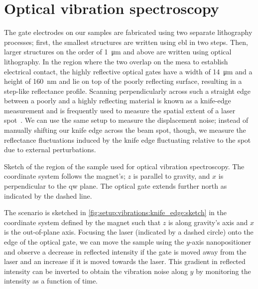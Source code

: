 \section{Optical vibration spectroscopy}\label{sec:setup:vibrations:optic}
The gate electrodes on our samples are fabricated using two separate lithography processes; first, the smallest structures are written using \gls{ebl} in two steps.
Then, larger structures on the order of \qty{1}{\micro\meter} and above are written using optical lithography.
In the region where the two overlap on the mesa to establish electrical contact, the highly reflective  optical gates have a width of \qty{14}{\micro\meter} and a height of \qty{160}{\nano\meter} and lie on top of the poorly reflecting  surface, resulting in a step-like reflectance profile.
Scanning perpendicularly across such a straight edge between a poorly and a highly reflecting material is known as a knife-edge measurement and is frequently used to measure the spatial extent of a laser spot~\cite{Arnaud1971,Skinner1972,Khosrofian1983}.
We can use the same setup to measure the displacement noise; instead of manually shifting our knife edge across the beam spot, though, we measure the reflectance fluctuations induced by the knife edge fluctuating relative to the spot due to external perturbations.

\begin{marginfigure}
    \centering
    
    \caption[]{
        Sketch of the region of the sample used for optical vibration spectroscopy.
        The coordinate system follows the magnet's; $z$ is parallel to gravity, and $x$ is perpendicular to the \gls{qw} plane.
        The optical gate extends further north as indicated by the dashed line.
    }
    \label{fig:setup:vibrations:knife_edge:sketch}
\end{marginfigure}

The scenario is sketched in \cref{fig:setup:vibrations:knife_edge:sketch} in the coordinate system defined by the magnet such that $z$ is along gravity's axis and $x$ is the out-of-plane axis.
Focusing the laser (indicated by a dashed circle) onto the edge of the optical gate, we can move the sample using the $y$-axis nanopositioner and observe a decrease in reflected intensity if the gate is moved away from the laser and an increase if it is moved towards the laser.
This gradient in reflected intensity can be inverted to obtain the vibration noise along $y$ by monitoring the intensity as a function of time.

